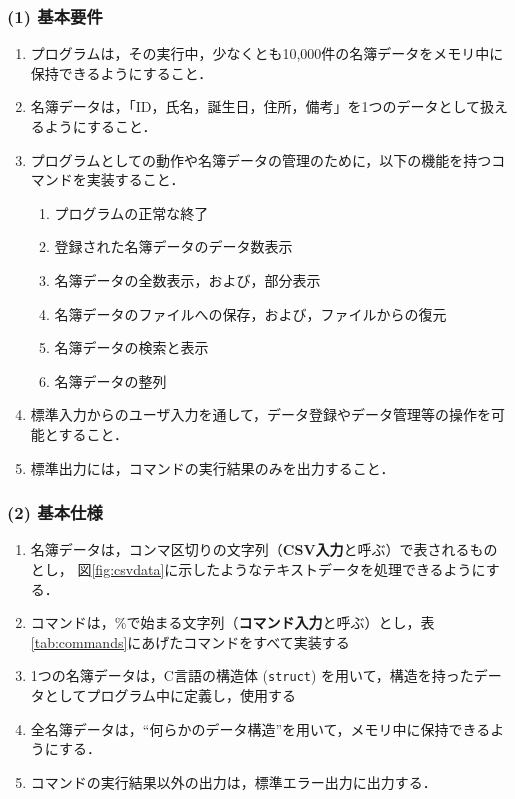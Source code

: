 \subsubsection*{(1) 基本要件}

\begin{enumerate}
  \setlength{\parskip}{0em} \setlength{\itemsep}{0.25em}  %
    \item プログラムは，その実行中，少なくとも10,000件の名簿データをメモリ中に保持できるようにすること．
    \item 名簿データは，「ID，氏名，誕生日，住所，備考」を1つのデータとして扱えるようにすること．
    \item プログラムとしての動作や名簿データの管理のために，以下の機能を持つコマンドを実装すること．
    \begin{enumerate} \setlength{\parskip}{0em} \setlength{\itemsep}{0.25em}
        \item プログラムの正常な終了
        \item 登録された名簿データのデータ数表示
        \item 名簿データの全数表示，および，部分表示
        \item 名簿データのファイルへの保存，および，ファイルからの復元
        \item 名簿データの検索と表示
        \item 名簿データの整列
    \end{enumerate}
    \item 標準入力からのユーザ入力を通して，データ登録やデータ管理等の操作を可能とすること．
    \item 標準出力には，コマンドの実行結果のみを出力すること．
\end{enumerate}

\subsubsection*{(2) 基本仕様}

\begin{enumerate}
  \setlength{\parskip}{0em} \setlength{\itemsep}{0.25em}  %
    \item 名簿データは，コンマ区切りの文字列（\textbf{CSV入力}と呼ぶ）で表されるものとし，
          図\ref{fig:csvdata}に示したようなテキストデータを処理できるようにする．%
    \item コマンドは，\%で始まる文字列（\textbf{コマンド入力}と呼ぶ）とし，表\ref{tab:commands}にあげたコマンドをすべて実装する
    \item 1つの名簿データは，C言語の構造体 (\texttt{struct}) を用いて，構造を持ったデータとしてプログラム中に定義し，使用する
    \item 全名簿データは，“何らかのデータ構造”を用いて，メモリ中に保持できるようにする．
    \item コマンドの実行結果以外の出力は，標準エラー出力に出力する．
\end{enumerate}


